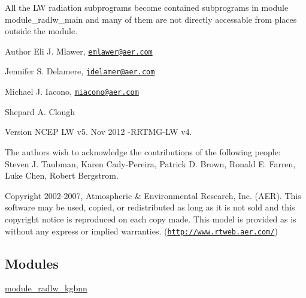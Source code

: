 All the LW radiation subprograms become contained subprograms in module \textquotesingle{}module\+\_\+radlw\+\_\+main\textquotesingle{} and many of them are not directly accessable from places outside the module.

\begin{DoxyAuthor}{Author}
Eli J. Mlawer, \href{mailto:emlawer@aer.com}{\tt emlawer@aer.\+com} 

Jennifer S. Delamere, \href{mailto:jdelamer@aer.com}{\tt jdelamer@aer.\+com} 

Michael J. Iacono, \href{mailto:miacono@aer.com}{\tt miacono@aer.\+com} 

Shepard A. Clough 
\end{DoxyAuthor}
\begin{DoxyVersion}{Version}
N\+C\+EP LW v5. Nov 2012 -\/\+R\+R\+T\+M\+G-\/\+LW v4.
\end{DoxyVersion}
The authors wish to acknowledge the contributions of the following people\+: Steven J. Taubman, Karen Cady-\/\+Pereira, Patrick D. Brown, Ronald E. Farren, Luke Chen, Robert Bergstrom.

\begin{DoxyCopyright}{Copyright}
2002-\/2007, Atmospheric \& Environmental Research, Inc. (A\+ER). This software may be used, copied, or redistributed as long as it is not sold and this copyright notice is reproduced on each copy made. This model is provided as is without any express or implied warranties. (\href{http://www.rtweb.aer.com/}{\tt http\+://www.\+rtweb.\+aer.\+com/}) 
\end{DoxyCopyright}
\subsection*{Modules}
\begin{DoxyCompactItemize}
\item 
\hyperlink{group__module__radlw__kgbnn}{module\+\_\+radlw\+\_\+kgbnn}
\end{DoxyCompactItemize}

